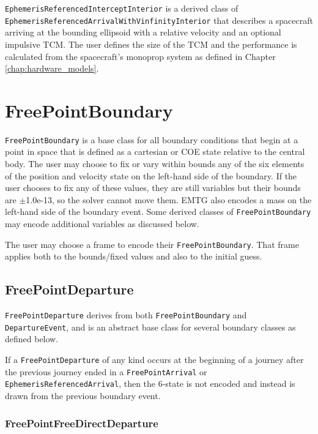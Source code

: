 \texttt{EphemerisReferencedInterceptInterior} is a derived class of \texttt{EphemerisReferencedArrivalWithVinfinityInterior} that describes a spacecraft arriving at the bounding ellipsoid with a relative velocity and an optional impulsive TCM. The user defines the size of the TCM and the performance is calculated from the spacecraft's monoprop system as defined in Chapter \ref{chap:hardware_models}.

\section{FreePointBoundary}
\label{sec:freepointboundary}

\texttt{FreePointBoundary} is a base class for all boundary conditions that begin at a point in space that is defined as a cartesian or \ac{COE} state relative to the central body. The user may choose to fix or vary within bounds any of the six elements of the position and velocity state on the left-hand side of the boundary. If the user chooses to fix any of these values, they are still variables but their bounds are $\pm$1.0e-13, so the solver cannot move them. EMTG also encodes a mass on the left-hand side of the boundary event. Some derived classes of \texttt{FreePointBoundary} may encode additional variables as discussed below.

The user may choose a frame to encode their \texttt{FreePointBoundary}. That frame applies both to the bounds/fixed values and also to the initial guess.

\subsection{FreePointDeparture}
\label{subsec:FreePointDeparture}

\texttt{FreePointDeparture} derives from both \texttt{FreePointBoundary} and \texttt{DepartureEvent}, and is an abstract base class for several boundary classes as defined below.

If a \texttt{FreePointDeparture} of any kind occurs at the beginning of a journey after the previous journey ended in a  \texttt{FreePointArrival} or \texttt{EphemerisReferencedArrival}, then the 6-state is not encoded and instead is drawn from the previous boundary event.

\subsubsection{FreePointFreeDirectDeparture}
\label{subsubsec:FreePointFreeDirectDeparture}

